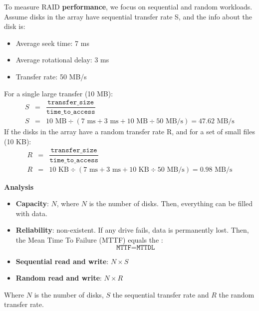 \highspace
To measure RAID \textbf{performance}, we focus on sequential and random workloads. Assume disks in the array have sequential transfer rate S, and the info about the disk is:
\begin{itemize}
    \item Average seek time: 7 ms
    \item Average rotational delay: 3 ms
    \item Transfer rate: 50 MB/s
\end{itemize}
For a single large transfer (10 MB):
\begin{equation*}
    \begin{array}{rcl}
        S &=& \dfrac{\texttt{transfer\_size}}{\texttt{time\_to\_access}} \\ [1.2em]
        S &=& 10 \text{ MB} \div \left(7 \text{ ms} + 3 \text{ ms} + 10 \text{ MB} \div 50 \text{ MB/s}\right) = 47.62 \text{ MB/s}
    \end{array}
\end{equation*}
If the disks in the array have a random transfer rate R, and for a set of small files (10 KB):
\begin{equation*}
    \begin{array}{rcl}
        R &=& \dfrac{\texttt{transfer\_size}}{\texttt{time\_to\_access}} \\ [1.2em]
        R &=& 10 \text{ KB} \div \left(7 \text{ ms} + 3 \text{ ms} + 10 \text{ KB} \div 50 \text{ MB/s}\right) = 0.98 \text{ MB/s}
    \end{array}
\end{equation*}

\highspace
\begin{flushleft}
    \textcolor{Green3}{ \textbf{Analysis}}
\end{flushleft}
\begin{itemize}
    \item \textbf{Capacity}: $N$, where $N$ is the number of disks. Then, everything can be filled with data.

    \item \textbf{Reliability}: non-existent. If any drive fails, data is permanently lost. Then, the Mean Time To Failure (MTTF) equals the :
    \begin{equation*}
        \texttt{MTTF} = \texttt{MTTDL}
    \end{equation*}

    \item \textbf{Sequential read and write}: $N \times S$

    \item \textbf{Random read and write}: $N \times R$
\end{itemize}
Where $N$ is the number of disks, $S$ the sequential transfer rate and $R$ the random transfer rate.

